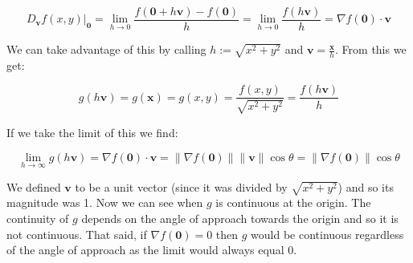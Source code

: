 \documentclass{article}
\begin{document}
$$D_{\mathbf v}f(x,y)\Big|_{\mathbf 0}=\lim_{h\to 0}\frac{f(\mathbf 0+h\mathbf v)-f(\mathbf 0)}{h}=\lim_{h\to 0}\frac{f(h\mathbf v)}{h}=\nabla f(\mathbf 0)\cdot\mathbf v$$

We can take advantage of this by calling $h:=\sqrt{x^2+y^2}$ and $\mathbf v=\frac{\mathbf x}{h}$. From this we get:

$$g(h\mathbf v)=g(\mathbf x)=g(x,y)=\frac{f(x,y)}{\sqrt{x^2+y^2}}=\frac{f(h\mathbf v)}{h}$$

If we take the limit of this we find:

$$\lim_{h\to\infty}g(h\mathbf v)=\nabla f(\mathbf 0)\cdot\mathbf v=\|\nabla f(\mathbf 0)\|\|\mathbf v\|\cos\theta=\|\nabla f(\mathbf 0)\|\cos\theta$$

We defined $\mathbf v$ to be a unit vector (since it was divided by $\sqrt{x^2+y^2}$) and so its magnitude was 1. Now we can see when $g$ is continuous at the origin. The continuity of $g$ depends on the angle of approach towards the origin and so it is not continuous. That said, if $\nabla f(\mathbf 0)=0$ then $g$ would be continuous regardless of the angle of approach as the limit would always equal 0.
\end{document}
